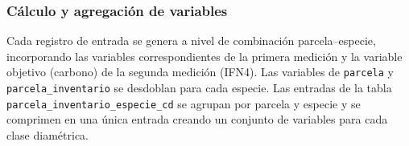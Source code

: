 \subsubsection{Cálculo y agregación de variables}

Cada registro de entrada se genera a nivel de combinación parcela--especie, incorporando las variables correspondientes de la primera medición y la variable objetivo (carbono) de la segunda medición (IFN4). Las variables de \texttt{parcela} y \texttt{parcela\_inventario} se desdoblan para cada especie. Las entradas de la tabla \texttt{parcela\_inventario\_especie\_cd} se agrupan por parcela y especie y se comprimen en una única entrada creando un conjunto de variables para cada clase diamétrica.



